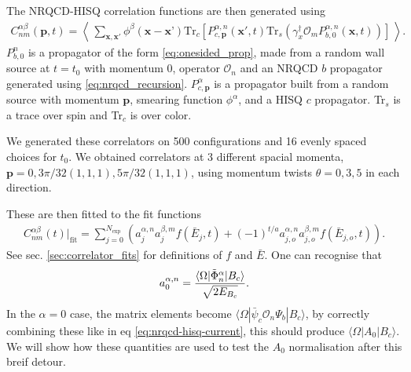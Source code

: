 The NRQCD-HISQ correlation functions are then generated using
\begin{align}
  C_{nm}^{\alpha \beta}({\textbf{p}},t) = \left\langle\, \sum_{\textbf{x},\textbf{x}'} \phi^{\beta}({\textbf{x}-\textbf{x'}})\text{Tr}_c \left[  P^{\alpha,n}_{c,{\textbf{p}}}({\textbf{x}}',t) \text{Tr}_s\left( \gamma_x^{\dagger} \mathcal{O}_m P^{\alpha,n}_{b,0}({\textbf{x}},t) \right) \right]  \,\right\rangle.
  \label{eq:nrqcd-hisq-2pt}
\end{align}
$P^{n}_{b,0}$ is a propagator of the form \eqref{eq:onesided_prop}, made from a random wall source at $t=t_0$ with momentum $0$, operator $\mathcal{O}_n$ and an NRQCD $b$ propagator generated using \eqref{eq:nrqcd_recursion}. $P^{\alpha}_{c,{\textbf{p}}}$ is a propagator built from a random source with momentum ${\textbf{p}}$, smearing function $\phi^{\alpha}$, and a HISQ $c$ propagator. Tr$_s$ is a trace over spin and Tr$_c$ is over color.

We generated these correlators on 500 configurations and 16 evenly spaced choices for $t_0$. We obtained correlators at 3 different spacial momenta, $\textbf{p} = 0, 3\pi/32(1,1,1), 5\pi/32(1,1,1)$, using momentum twists $\theta=0,3,5$ in each direction.

These are then fitted to the fit functions 
\begin{align}
  C^{\alpha\beta}_{nm}(t)|_{\text{fit}} = \sum_{j=0}^{N_{\text{exp}}} \left( a^{\alpha,n}_j a^{\beta,m}_j f(\bar{E}_j,t) + (-1)^{t/a} a^{\alpha,n}_{j,o} a^{\beta,m}_{j,o} f(\bar{E}_{j,o},t) \right).
\end{align}
See sec. \ref{sec:correlator_fits} for definitions of $f$ and $\bar{E}$. One can recognise that
\begin{align}
  a_0^{\alpha,n} = {\langle \Omega | \tilde{\Phi}^{\alpha}_n | B_c \rangle \over \sqrt{2 E_{B_c}}}.
\end{align}
In the $\alpha=0$ case, the matrix elements become $\langle \Omega | \bar{\psi}_c \mathcal{O}_n \Psi_b | B_c \rangle$, by correctly combining these like in eq \eqref{eq:nrqcd-hisq-current}, this should produce $\langle \Omega | A_0 | B_c \rangle$. We will show how these quantities are used to test the $A_0$ normalisation after this breif detour.

